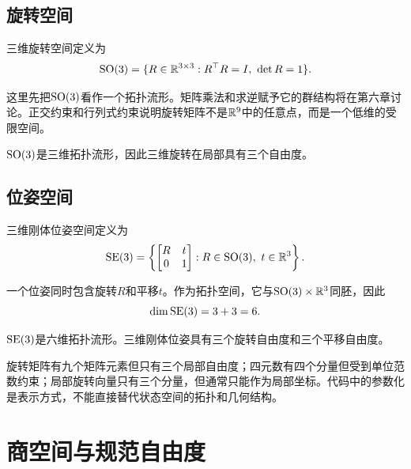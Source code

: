 \subsection{旋转空间}

\begin{definition}[特殊正交群]
三维旋转空间定义为
\[
    \operatorname{SO}(3)
    =
    \{R\in\mathbb{R}^{3\times3}:R^\top R=I,\ \det R=1\}.
\]
\end{definition}

这里先把$\SO(3)$看作一个拓扑流形。矩阵乘法和求逆赋予它的群结构将在第六章讨论。正交约束和行列式约束说明旋转矩阵不是$\mathbb{R}^9$中的任意点，而是一个低维的受限空间。

\begin{theorem}[$\SO(3)$的维数]
$\SO(3)$是三维拓扑流形，因此三维旋转在局部具有三个自由度。
\end{theorem}

\subsection{位姿空间}

\begin{definition}[特殊欧氏群]
三维刚体位姿空间定义为
\[
    \operatorname{SE}(3)
    =
    \left\{
    \begin{bmatrix}
        R&t\\
        0&1
    \end{bmatrix}
    :
    R\in\operatorname{SO}(3),\ t\in\mathbb{R}^3
    \right\}.
\]
\end{definition}

一个位姿同时包含旋转$R$和平移$t$。作为拓扑空间，它与$\operatorname{SO}(3)\times\mathbb{R}^3$同胚，因此
\[
    \dim\operatorname{SE}(3)=3+3=6.
\]

\begin{theorem}[$\SE(3)$的维数]
$\SE(3)$是六维拓扑流形。三维刚体位姿具有三个旋转自由度和三个平移自由度。
\end{theorem}

\begin{remark}[状态表示不是状态空间本身]
旋转矩阵有九个矩阵元素但只有三个局部自由度；四元数有四个分量但受到单位范数约束；局部旋转向量只有三个分量，但通常只能作为局部坐标。代码中的参数化是表示方式，不能直接替代状态空间的拓扑和几何结构。
\end{remark}


\section{商空间与规范自由度}

